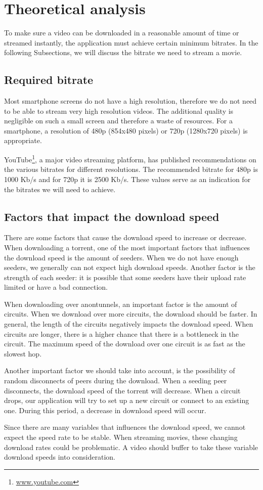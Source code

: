\section{Theoretical analysis}
\label{sec:experiments:theoretical}
	To make sure a video can be downloaded in a reasonable amount of time or streamed instantly, the application must achieve certain minimum bitrates. In the following Subsections, we will discuss the bitrate we need to stream a movie.
	
	\subsection{Required bitrate}
	\label{sec:experiments:theoretical:bitrates}
		Most smartphone screens do not have a high resolution, therefore we do not need to be able to stream very high resolution videos. The additional quality is negligible on such a small screen and therefore a waste of resources. For a smartphone, a resolution of 480p (854x480 pixels) or 720p (1280x720 pixels) is appropriate.
		
		YouTube\footnote{\href{https://www.youtube.com/}{www.youtube.com}}, a major video streaming platform, has published recommendations on the various bitrates for different resolutions\cite{googlebitrates}. The recommended bitrate for 480p is 1000 Kb/s and for 720p it is 2500 Kb/s. These values serve as an indication for the bitrates we will need to achieve. 
		
	\subsection{Factors that impact the download speed}
		There are some factors that cause the download speed to increase or decrease. When downloading a torrent, one of the most important factors that influences the download speed is the amount of seeders. When we do not have enough seeders, we generally can not expect high download speeds. Another factor is the strength of each seeder: it is possible that some seeders have their upload rate limited or have a bad connection.
		
		When downloading over anontunnels, an important factor is the amount of circuits. When we download over more circuits, the download should be faster. In general, the length of the circuits negatively impacts the download speed. When circuits are longer, there is a higher chance that there is a bottleneck in the circuit. The maximum speed of the download over one circuit is as fast as the slowest hop.
		
		Another important factor we should take into account, is the possibility of random disconnects of peers during the download. When a seeding peer disconnects, the download speed of the torrent will decrease. When a circuit drops, our application will try to set up a new circuit or connect to an existing one. During this period, a decrease in download speed will occur.
		
		Since there are many variables that influences the download speed, we cannot expect the speed rate to be stable. When streaming movies, these changing download rates could be problematic. A video should buffer to take these variable download speeds into consideration.